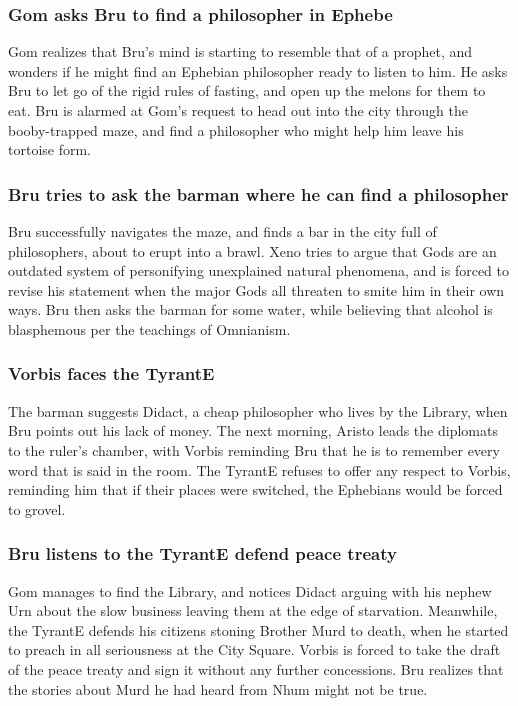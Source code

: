 \subsubsection{\Gls{Gom} asks \Gls{Bru} to find a philosopher in Ephebe}
\Gls{Gom} realizes that \Gls{Bru}'s mind is starting to resemble that of a prophet, and wonders if
he might find an Ephebian philosopher ready to listen to him. He asks \Gls{Bru} to let go of the
rigid rules of fasting, and open up the melons for them to eat. \Gls{Bru} is alarmed at \Gls{Gom}'s
request to head out into the city through the booby-trapped maze, and find a philosopher who might
help him leave his tortoise form.

\subsubsection{\Gls{Bru} tries to ask the barman where he can find a philosopher}
\Gls{Bru} successfully navigates the maze, and finds a bar in the city full of philosophers, about
to erupt into a brawl. \Gls{Xeno} tries to argue that Gods are an outdated system of personifying
unexplained natural phenomena, and is forced to revise his statement when the major Gods all
threaten to smite him in their own ways. \Gls{Bru} then asks the barman for some water, while
believing that alcohol is blasphemous per the teachings of Omnianism.

\subsubsection{\Gls{Vorbis} faces the \Gls{TyrantE}}
The barman suggests \Gls{Didact}, a cheap philosopher who lives by the Library, when \Gls{Bru}
points out his lack of money. The next morning, \Gls{Aristo} leads the diplomats to the ruler's
chamber, with \Gls{Vorbis} reminding \Gls{Bru} that he is to remember every word that is said in
the room. The \Gls{TyrantE} refuses to offer any respect to \Gls{Vorbis}, reminding him that if
their places were switched, the Ephebians would be forced to grovel.

\subsubsection{\Gls{Bru} listens to the \Gls{TyrantE} defend peace treaty}
\Gls{Gom} manages to find the Library, and notices \Gls{Didact} arguing with his nephew \Gls{Urn}
about the slow business leaving them at the edge of starvation. Meanwhile, the \Gls{TyrantE} defends
his citizens stoning Brother \Gls{Murd} to death, when he started to preach in all seriousness at
the City Square. \Gls{Vorbis} is forced to take the draft of the peace treaty and sign it without
any further concessions. \Gls{Bru} realizes that the stories about \Gls{Murd} he had heard from
\Gls{Nhum} might not be true.

